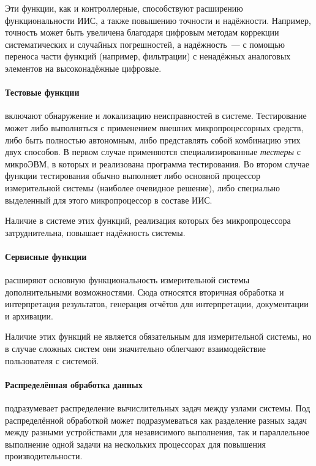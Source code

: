 \documentclass[a4paper, 14pt, titlepage]{extarticle}
\newcommand{\term}[1]{\emph{#1}}
\let\oldparagraph\paragraph
\renewcommand{\paragraph}[1]{\oldparagraph{\indent #1}}
\begin{document}
  Эти функции, как и контроллерные, способствуют расширению функциональности ИИС, а также повышению
  точности и надёжности. Например, точность может быть увеличена благодаря цифровым методам
  коррекции систематических и случайных погрешностей, а надёжность~--- с помощью переноса части
  функций (например, фильтрации) с ненадёжных аналоговых элементов на высоконадёжные цифровые.

  \paragraph{Тестовые функции} включают обнаружение и локализацию неисправностей в системе.
  Тестирование может либо выполняться с применением внешних микропроцессорных средств, либо быть
  полностью автономным, либо представлять собой комбинацию этих двух способов. В первом случае
  применяются специализированные \term{тестеры} с микроЭВМ, в которых и реализована программа
  тестирования. Во втором случае функции тестирования обычно выполняет либо основной процессор
  измерительной системы (наиболее очевидное решение), либо специально выделенный для этого
  микропроцессор в составе ИИС.

  Наличие в системе этих функций, реализация которых без микропроцессора затруднительна,
  повышает надёжность системы.

  \paragraph{Сервисные функции} расширяют основную функциональность измерительной системы
  дополнительными возможностями. Сюда относятся вторичная обработка и интерпретация результатов,
  генерация отчётов для интерпретации, документации и архивации.

  Наличие этих функций не является обязательным для измерительной системы, но в случае сложных
  систем они значительно облегчают взаимодействие пользователя с системой.

  \paragraph{Распределённая обработка данных} подразумевает распределение вычислительных задач между
  узлами системы. Под распределённой обработкой может подразумеваться как разделение разных задач
  между разными устройствами для независимого выполнения, так и параллельное выполнение одной задачи
  на нескольких процессорах для повышения производительности.
\end{document}
